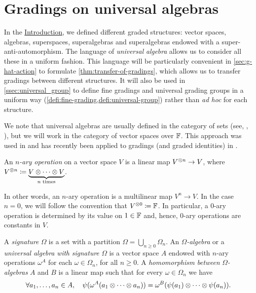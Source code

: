 
\section{Gradings on universal algebras}\label{sec:Omega-algebras}

In the \hyperref[chap:intro]{Introduction}, we defined different graded structures: vector spaces, algebras, superspaces, superalgebras and superalgebras endowed with a super-anti-automorphism. 
The language of \emph{universal algebra} allows us to consider all these in a uniform fashion. 
This language will be particularly convenient in \cref{sec:g-hat-action} to formulate \cref{thm:transfer-of-gradings}, which allows us to transfer gradings between different structures. 
It will also be used in \cref{ssec:universal_group} to define fine gradings and universal grading groups in a uniform way (\cref{defi:fine-grading,defi:universal-group}) rather than \emph{ad hoc} for each structure. 

We note that universal algebras are usually defined in the category of sets (see, \eg, \cite{Cohn_universal}), but we will work in the category of vector spaces over $\mathbb{F}$. 
This approach was used in \cite{Razmyslov} and has recently been applied to gradings (and graded identities) in \cite{MR3886336}. 

\begin{defi}
    An \emph{$n$-ary operation} on a vector space $V$ is 
    a linear map $V^{\otimes n} \to V$, where $V^{\otimes n} \coloneqq \underbrace{V\otimes\cdots\otimes V}_{n \text{ times}}$. 
\end{defi}

In other words, an $n$-ary operation is a multilinear map $V^n \to V$. 
In the case $n = 0$, we will follow the convention that $V^{\otimes 0} \coloneqq \mathbb{F}$. 
In particular, a $0$-ary operation is determined by its value on $1 \in \mathbb{F}$ and, hence, $0$-ary operations are constants in $V$. 

\begin{defi}\label{def:universal-algebra}
	A \emph{signature} $\Omega$ is a set with a partition $\Omega = \bigcup_{n \geq 0} \Omega_n$.
	An \emph{$\Omega$-algebra} or a \emph{universal algebra with signature $\Omega$} is a vector space $A$ endowed with $n$-ary operations $\omega^A$ for each $\omega \in \Omega_n$, for all $n \geq 0$. 
	A \emph{homomorphism between $\Omega$-algebras} $A$ and $B$ is a linear map such that for every $\omega \in \Omega_n$ we have
	\[
		\forall a_1, \ldots, a_n \in A, \quad 
		\psi( \omega^A (a_1 \otimes \cdots \otimes a_n) ) = \omega^B ( \psi(a_1) \otimes \cdots \otimes \psi(a_n) ). 
	\]
\end{defi}

